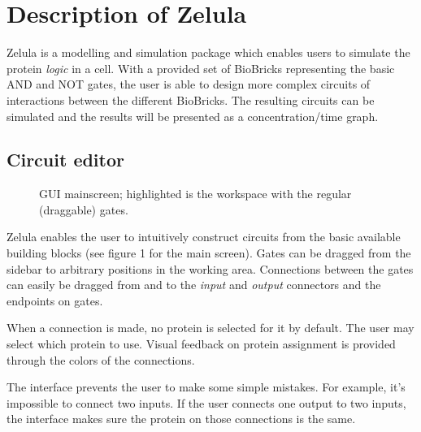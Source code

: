 

\newcommand{\screenshotScale}{1.4}


\section{Description of Zelula}
\label{product-description}
Zelula is a modelling and simulation package which enables users to simulate the protein \textit{logic} in a cell. With a provided set of BioBricks representing the basic AND and NOT gates, the user is able to design more complex circuits of interactions between the different BioBricks. The resulting circuits can be simulated and the results will be presented as a concentration/time graph.


\subsection{Circuit editor}
\begin{figure}[h!]
\centering{}
\caption{GUI mainscreen; highlighted is the workspace with the regular (draggable) gates.}
\end{figure}

\noindent Zelula enables the user to intuitively construct circuits from the basic available building blocks (see figure 1 for the main screen). Gates can be dragged from the sidebar to arbitrary positions in the working area. Connections between the gates can easily be dragged from and to the \textit{input} and \textit{output} connectors and the endpoints on gates. 

When a connection is made, no protein is selected for it by default. The user may select which protein to use. Visual feedback on protein assignment is provided through the colors of the connections.

The interface prevents the user to make some simple mistakes. For example, it's impossible to connect two inputs. If the user connects one output to two inputs, the interface makes sure the protein on those connections is the same.


